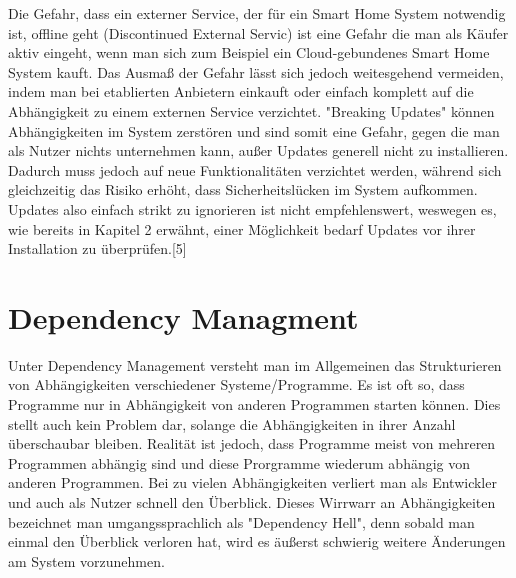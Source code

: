 Die Gefahr, dass ein externer Service, der für ein Smart Home System notwendig ist, offline geht (Discontinued External Servic) ist eine Gefahr die man
als Käufer aktiv eingeht, wenn man sich zum Beispiel ein Cloud-gebundenes Smart Home System kauft. Das Ausmaß der Gefahr lässt sich jedoch
weitesgehend vermeiden, indem man bei etablierten Anbietern einkauft oder einfach komplett auf die Abhängigkeit zu einem externen Service
verzichtet. "Breaking Updates" können Abhängigkeiten im System zerstören und sind somit eine Gefahr, gegen die man als Nutzer nichts unternehmen
kann, außer Updates generell nicht zu installieren. Dadurch muss jedoch auf neue Funktionalitäten verzichtet werden, während sich  gleichzeitig das Risiko erhöht,
dass Sicherheitslücken im System aufkommen. Updates also einfach strikt zu ignorieren ist nicht empfehlenswert, weswegen es, wie bereits in Kapitel
2 erwähnt, einer Möglichkeit bedarf Updates vor ihrer Installation zu überprüfen.[5]

\newpage
\section{Dependency Managment}
Unter Dependency Management versteht man im Allgemeinen das Strukturieren von Abhängigkeiten verschiedener 
Systeme/Programme. Es ist oft so, dass Programme nur in Abhängigkeit von anderen Programmen starten können.
Dies stellt auch kein Problem dar, solange die Abhängigkeiten in ihrer Anzahl überschaubar bleiben. 
Realität ist jedoch, dass Programme meist von mehreren Programmen abhängig sind und diese
Prorgramme wiederum abhängig von anderen Programmen. Bei zu vielen Abhängigkeiten verliert man 
als Entwickler und auch als Nutzer schnell den Überblick. Dieses Wirrwarr an Abhängigkeiten bezeichnet man umgangssprachlich 
als "Dependency Hell", denn sobald man einmal den Überblick verloren hat, wird es äußerst schwierig weitere Änderungen am
System vorzunehmen.

